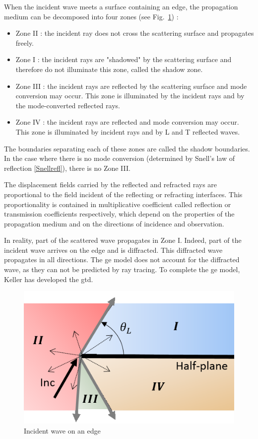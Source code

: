 When the incident wave meets a surface containing an edge, the propagation medium can be decomposed into four zones (see Fig.~\ref{illuzones}) :
\begin{itemize}
    \item Zone II : the incident ray does not cross the scattering surface and propagates freely.
    \item Zone I : the incident rays are "shadowed" by the scattering surface and therefore do not illuminate this zone, called the shadow zone.
    \item Zone III :  the incident rays are reflected by the scattering surface and mode conversion may occur. This zone is illuminated by the incident rays and by the mode-converted reflected rays.
    \item Zone IV : the incident rays are reflected and mode conversion may occur. This zone is illuminated by incident rays and by L and T reflected waves.
\end{itemize}
The boundaries separating each of these zones are called the shadow boundaries. In the case where there is no mode conversion (determined by Snell's law of reflection \eqref{Snellrefl}), there is no Zone III. 

The displacement fields carried by the reflected and refracted rays are proportional to the field incident of the reflecting or refracting interfaces. This proportionality is contained in multiplicative coefficient called reflection or transmission coefficients respectively, which depend on the properties of the propagation medium and on the directions of incidence and observation.

In reality, part of the scattered wave propagates in Zone I. Indeed, part of the incident wave arrives on the edge and is diffracted. This diffracted wave propagates in all directions. The \acrshort{ge} model does not account for the diffracted wave, as they can not be predicted by ray tracing. To complete the \acrshort{ge} model, Keller \cite{GTD} has developed the \acrfull{gtd}.

\begin{figure}
    \centering
    \includegraphics[height=0.33\textheight]{images/chapter1/ShadowBoundary.png}
    \caption{Incident wave on an edge}
    \label{illuzones}
\end{figure}

